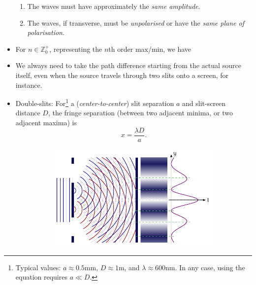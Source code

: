 \documentclass[oneside]{book}
\begin{document}
\begin{itemize}
\begin{enumerate}
        \item The waves must have approximately the \emph{same amplitude}.
        \item The waves, if transverse, must be \emph{unpolarised} or have the \emph{same plane of polarisation}. 
    \end{enumerate}
    \item For \(n \in \mathbb{Z}^{+}_{0}\), representing the \(n\)th order max/min, we have 
    \item We always need to take the path difference starting from the actual source itself, even when the source travels through two slits onto a screen, for instance.
    \item Double-slits: For\footnote{Typical values: \(a \approx 0.5\)mm, \(D \approx 1\)m, and \(\lambda \approx 600\)nm. In any case, using the equation requires \(a\ll D\).} a (\emph{center-to-center}) slit separation \(a\) and slit-screen distance \(D\), the fringe separation (between two adjacent minima, or two adjacent maxima) is
    \[x=\frac{\lambda D}{a}.\]
    \begin{figure}[H]
        \centering
        \begin{subfigure}[c]{0.5\textwidth}
            \centering
            \includegraphics[page=1,width=\textwidth]{../images/Double-slit diffraciton/double-slit.pdf}

\end{subfigure}
\end{figure}
\end{itemize}
\end{document}
